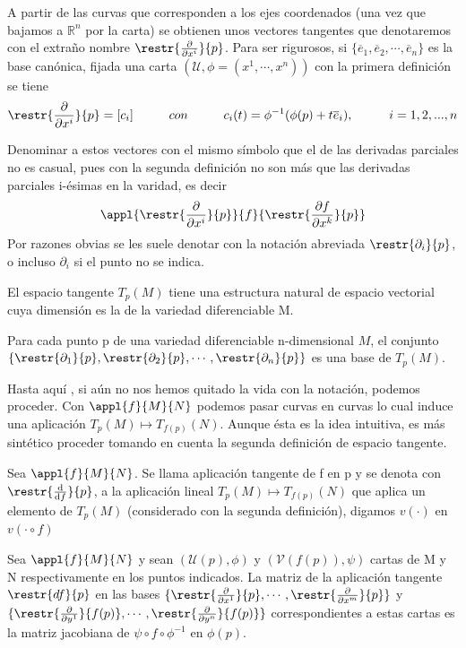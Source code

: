 \documentclass[palatino, bibnumbers]{apuntes}
\begin{document}
A partir de las curvas que corresponden a los ejes coordenados (una vez que bajamos a $ℝ^{n}$ por la carta) se obtienen unos vectores tangentes que denotaremos con el extraño nombre $\restr{\pdv{}{x^{i}}}{p}$. Para ser rigurosos, si $\{\overline{e}_1,\overline{e}_2,\cdots,\overline{e}_n\}$ es la base canónica, fijada una carta $(\mathcal{U},\phi=(x^1,\cdots,x^n))$ con la primera definición se tiene $$\restr{\pdv{}{x^{i}}}{p}=[c_i]\tab con \tab c_i(t)=\phi^{-1}(\phi(p)+t\overline{e}_i),\tab i=1,2,...,n $$

Denominar a estos vectores con el mismo símbolo que el de las derivadas parciales no es casual, pues con la segunda definición no son más que las derivadas parciales i-ésimas en la varidad, es decir 
\begin{equation}
\appl{\restr{\pdv{}{x^{i}}}{p}}{f}{\restr{\pdv{f}{x^{k}}}{p}}
\end{equation}
Por razones obvias se les suele denotar con la notación abreviada $\restr{\partial_i}{p}$, o incluso $\partial_i$ si el punto no se indica.
\begin{prop} El espacio tangente $T_p(M)$ tiene una estructura natural de espacio vectorial cuya dimensión es la de la variedad diferenciable M.
\end{prop}
\begin{prop} Para cada punto p de una variedad diferenciable n-dimensional $M$, el conjunto $\{\restr{\partial_1}{p},\restr{\partial_2}{p},\cdots,\restr{\partial_n}{p}\}$ es una base de $T_p(M)$.
\end{prop}
Hasta aquí , si aún no nos hemos quitado la vida con la notación, podemos proceder.
\newpage
Con $\appl{f}{M}{N}$ podemos pasar curvas en curvas lo cual induce una aplicación $T_p(M)\longmapsto T_{f(p)}(N)$. Aunque ésta es la idea intuitiva, es más sintético proceder tomando en cuenta la segunda definición de espacio tangente.

\begin{defn} Sea $\appl{f}{M}{N}$. Se llama aplicación tangente de f en p y se denota con $\restr{\dv{f}}{p}$, a la aplicación lineal $T_p(M)\longmapsto T_{f(p)}(N)$ que aplica un elemento de $T_p(M)$ (considerado con la segunda definición), digamos $v(\cdot)$ en $v(\cdot\circ f)$
\end{defn}
\begin{prop} Sea $\appl{f}{M}{N}$ y sean $(\mathcal{U}(p),\phi)$ y $(\mathcal{V}(f(p)),\psi)$ cartas de M y N respectivamente en los puntos indicados. La matriz de la aplicación tangente $\restr{df}{p}$ en las bases $\{\restr{\pdv{}{x^1}}{p},\cdots,\restr{\pdv{}{x^m}}{p}\}$ y $\{\restr{\pdv{}{y^1}}{f(p)},\cdots,\restr{\pdv{}{y^n}}{f(p)}\}$ correspondientes a estas cartas es la matriz jacobiana de $\psi\circ f\circ\phi^{-1}$ en $\phi(p)$.
\end{prop}
\end{document}
